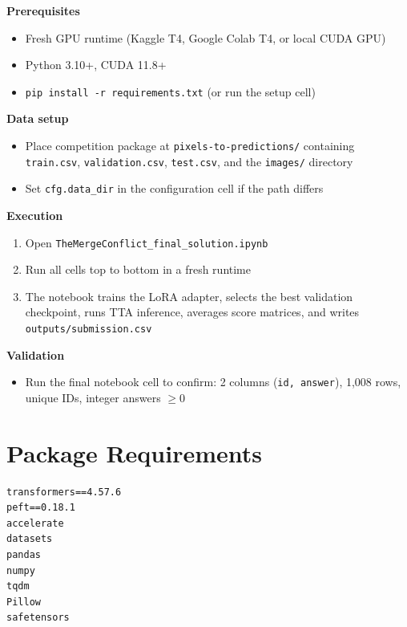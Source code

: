 \documentclass[11pt,twocolumn]{article}
\begin{document}
\begin{keybox}
\small\textbf{Prerequisites}\\[2pt]
\begin{itemize}[leftmargin=*, noitemsep, topsep=0pt]
  \item Fresh GPU runtime (Kaggle T4, Google Colab T4, or local CUDA GPU)
  \item Python 3.10+, CUDA 11.8+
  \item \texttt{pip install -r requirements.txt} (or run the setup cell)
\end{itemize}
\vspace{4pt}
\textbf{Data setup}\\[2pt]
\begin{itemize}[leftmargin=*, noitemsep, topsep=0pt]
  \item Place competition package at \texttt{pixels-to-predictions/} containing \texttt{train.csv}, \texttt{validation.csv}, \texttt{test.csv}, and the \texttt{images/} directory
  \item Set \texttt{cfg.data\_dir} in the configuration cell if the path differs
\end{itemize}
\vspace{4pt}
\textbf{Execution}\\[2pt]
\begin{enumerate}[leftmargin=*, noitemsep, topsep=0pt]
  \item Open \texttt{TheMergeConflict\_final\_solution.ipynb}
  \item Run all cells top to bottom in a fresh runtime
  \item The notebook trains the LoRA adapter, selects the best validation checkpoint, runs TTA inference, averages score matrices, and writes \texttt{outputs/submission.csv}
\end{enumerate}
\vspace{4pt}
\textbf{Validation}\\[2pt]
\begin{itemize}[leftmargin=*, noitemsep, topsep=0pt]
  \item Run the final notebook cell to confirm: 2 columns (\texttt{id, answer}), 1,008 rows, unique IDs, integer answers $\geq 0$
\end{itemize}
\end{keybox}

\section{Package Requirements}
\label{app:reqs}

\begin{small}
\begin{verbatim}
transformers==4.57.6
peft==0.18.1
accelerate
datasets
pandas
numpy
tqdm
Pillow
safetensors
\end{verbatim}
\end{small}
\end{document}
